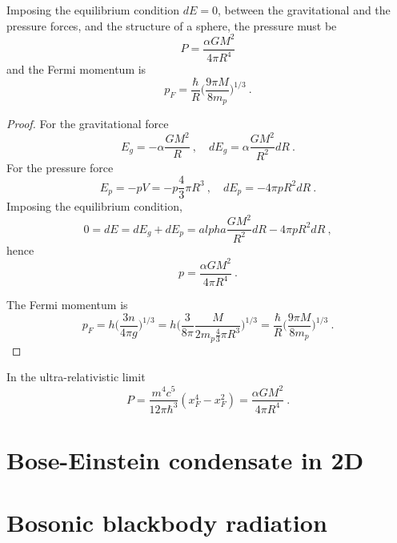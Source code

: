     Imposing the equilibrium condition $dE = 0$, between the gravitational and the pressure forces, and the structure of a sphere, the pressure must be 
    \begin{equation*}
        P = \frac{\alpha G M^2}{4 \pi R^4}
    \end{equation*}
    and the Fermi momentum is 
    \begin{equation*}
        p_F = \frac{\hbar}{R} \Big ( \frac{9 \pi M}{8 m_p} \Big)^{1/3} ~.
    \end{equation*}
    \begin{proof}
        For the gravitational force 
        \begin{equation*}
            E_g = - \alpha \frac{G M^2}{R} ~, \quad dE_g = \alpha \frac{GM^2}{R^2} dR ~.
        \end{equation*}
        For the pressure force 
        \begin{equation*}
            E_p = - p V = - p \frac{4}{3} \pi R^3 ~, \quad dE_p = - 4 \pi p R^2 dR ~.
        \end{equation*}
        Imposing the equilibrium condition, 
        \begin{equation*}
            0 = dE = dE_g + dE_p = alpha \frac{GM^2}{R^2} dR - 4 \pi p R^2 dR ~,
        \end{equation*}
        hence 
        \begin{equation*}
            p = \frac{\alpha G M^2}{4 \pi R^4} ~.
        \end{equation*}

        The Fermi momentum is 
        \begin{equation*}
            p_F = h \Big ( \frac{3 n}{4 \pi g} \Big)^{1/3} = h \Big ( \frac{3}{8 \pi} \frac{M}{2 m_p \frac{4}{3} \pi R^3} \Big)^{1/3} = \frac{\hbar}{R} \Big ( \frac{9 \pi M}{8 m_p} \Big)^{1/3}  ~.
        \end{equation*}
    \end{proof}

    In the ultra-relativistic limit
    \begin{equation*}
        P = \frac{m^4 c^5}{12 \pi \hbar^3} (x_F^4 - x_F^2) = \frac{\alpha G M^2}{4 \pi R^4} ~.
    \end{equation*}

\section{Bose-Einstein condensate in 2D}

\section{Bosonic blackbody radiation}

